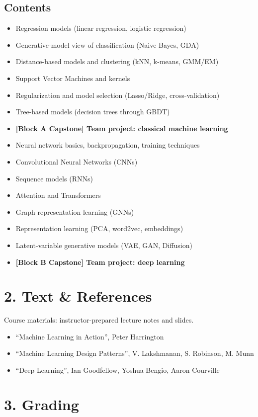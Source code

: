 \documentclass[11pt]{article}
\begin{document}
\subsection*{Contents}
\begin{itemize}[nosep]
\item Regression models (linear regression, logistic regression)
\item Generative-model view of classification (Naive Bayes, GDA)
\item Distance-based models and clustering (kNN, k-means, GMM/EM)
\item Support Vector Machines and kernels
\item Regularization and model selection (Lasso/Ridge, cross-validation)
\item Tree-based models (decision trees through GBDT)
\item \textbf{[Block A Capstone] Team project: classical machine learning}
\item Neural network basics, backpropagation, training techniques
\item Convolutional Neural Networks (CNNs)
\item Sequence models (RNNs)
\item Attention and Transformers
\item Graph representation learning (GNNs)
\item Representation learning (PCA, word2vec, embeddings)
\item Latent-variable generative models (VAE, GAN, Diffusion)
\item \textbf{[Block B Capstone] Team project: deep learning}
\end{itemize}

\section*{2. Text \& References}
Course materials: instructor-prepared lecture notes and slides.
\begin{itemize}[nosep]
\item ``Machine Learning in Action'', Peter Harrington
\item ``Machine Learning Design Patterns'', V. Lakshmanan, S. Robinson,
  M. Munn
\item ``Deep Learning'', Ian Goodfellow, Yoshua Bengio, Aaron Courville
\end{itemize}

\section*{3. Grading}
\end{document}
